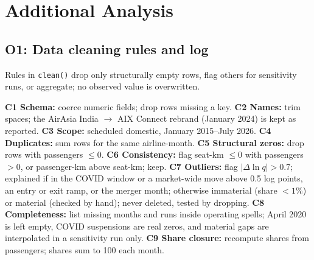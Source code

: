 \documentclass[12pt,a4paper]{article}
\newif\ifoneon
\newcommand{\oneHL}{\par\oneontrue\color{orange}\captionsetup{font+={color=blue}}}
\begin{document}
\section{Additional Analysis}
\label{app:o4-route-preparation}
{\oneHL \subsection{O1: Data cleaning rules and log}
\label{app:o1-cleaning}
Rules in \texttt{clean()} drop only structurally empty rows, flag others for sensitivity runs, or aggregate; no observed value is overwritten.

\textbf{C1 Schema:} coerce numeric fields; drop rows missing a key. \textbf{C2 Names:} trim spaces; the AirAsia India $\to$ AIX Connect rebrand (January 2024) is kept as reported. \textbf{C3 Scope:} scheduled domestic, January 2015--July 2026. \textbf{C4 Duplicates:} sum rows for the same airline-month. \textbf{C5 Structural zeros:} drop rows with passengers $\leq0$. \textbf{C6 Consistency:} flag seat-km $\leq0$ with passengers $>0$, or passenger-km above seat-km; keep. \textbf{C7 Outliers:} flag $|\Delta\ln q|>0.7$; explained if in the COVID window or a market-wide move above 0.5 log points, an entry or exit ramp, or the merger month; otherwise immaterial (share $<1\%$) or material (checked by hand); never deleted, tested by dropping. \textbf{C8 Completeness:} list missing months and runs inside operating spells; April 2020 is left empty, COVID suspensions are real zeros, and material gaps are interpolated in a sensitivity run only. \textbf{C9 Share closure:} recompute shares from passengers; shares sum to 100 each month.

}
\end{document}
